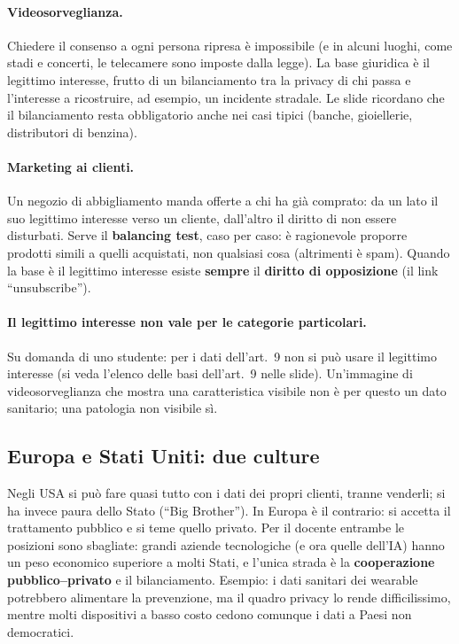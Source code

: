 \paragraph{Videosorveglianza.} Chiedere il consenso a ogni persona ripresa è impossibile (e in alcuni
luoghi, come stadi e concerti, le telecamere sono imposte dalla legge). La base giuridica è il
legittimo interesse, frutto di un bilanciamento tra la privacy di chi passa e l'interesse a
ricostruire, ad esempio, un incidente stradale. Le slide ricordano che il bilanciamento resta
obbligatorio anche nei casi tipici (banche, gioiellerie, distributori di benzina).

\paragraph{Marketing ai clienti.} Un negozio di abbigliamento manda offerte a chi ha già comprato: da un
lato il suo legittimo interesse verso un cliente, dall'altro il diritto di non essere disturbati. Serve
il \textbf{balancing test}, caso per caso: è ragionevole proporre prodotti simili a quelli acquistati,
non qualsiasi cosa (altrimenti è spam). Quando la base è il legittimo interesse esiste \textbf{sempre}
il \textbf{diritto di opposizione} (il link ``unsubscribe'').

\paragraph{Il legittimo interesse non vale per le categorie particolari.} Su domanda di uno studente:
per i dati dell'art.~9 non si può usare il legittimo interesse (si veda l'elenco delle basi dell'art.~9
nelle slide). Un'immagine di videosorveglianza che mostra una caratteristica visibile non è per questo
un dato sanitario; una patologia non visibile sì.

\subsection{Europa e Stati Uniti: due culture}
Negli USA si può fare quasi tutto con i dati dei propri clienti, tranne venderli; si ha invece paura
dello Stato (``Big Brother''). In Europa è il contrario: si accetta il trattamento pubblico e si teme
quello privato. Per il docente entrambe le posizioni sono sbagliate: grandi aziende tecnologiche (e ora
quelle dell'IA) hanno un peso economico superiore a molti Stati, e l'unica strada è la
\textbf{cooperazione pubblico--privato} e il bilanciamento. Esempio: i dati sanitari dei wearable
potrebbero alimentare la prevenzione, ma il quadro privacy lo rende difficilissimo, mentre molti
dispositivi a basso costo cedono comunque i dati a Paesi non democratici.

